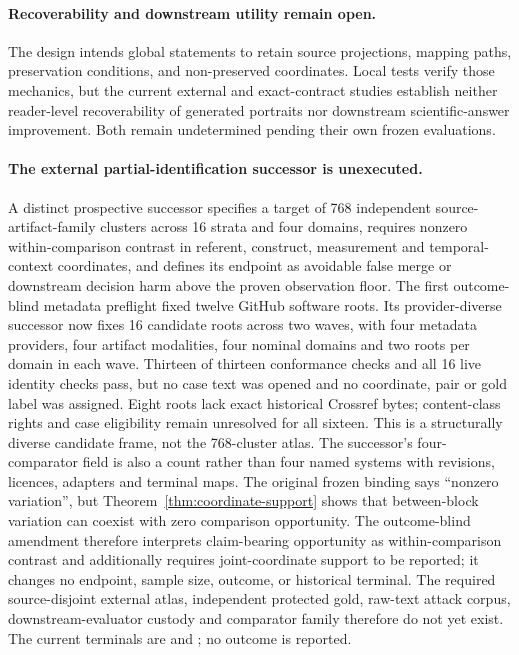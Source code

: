 \paragraph{Recoverability and downstream utility remain open.}
The design intends global statements to retain source projections, mapping
paths, preservation conditions, and non-preserved coordinates. Local tests
verify those mechanics, but the current external and exact-contract studies
establish neither reader-level recoverability of generated portraits nor
downstream scientific-answer improvement. Both remain undetermined pending
their own frozen evaluations.

\paragraph{The external partial-identification successor is unexecuted.}
A distinct prospective successor specifies a target of 768 independent
source-artifact-family clusters across 16 strata and four domains, requires
nonzero within-comparison contrast in referent, construct, measurement and temporal-context
coordinates, and defines its endpoint as avoidable false merge or downstream
decision harm above the proven observation floor. The first outcome-blind
metadata preflight fixed twelve GitHub software roots. Its provider-diverse
successor now fixes 16 candidate roots across two waves, with four metadata
providers, four artifact modalities, four nominal domains and two roots per
domain in each wave. Thirteen of thirteen conformance checks and all 16 live
identity checks pass, but no case text was opened and no coordinate, pair or
gold label was assigned. Eight roots lack exact historical Crossref bytes;
content-class rights and case eligibility remain unresolved for all sixteen.
This is a structurally diverse candidate frame, not the 768-cluster atlas.
The successor's four-comparator field is also a count rather than four named systems with
revisions, licences, adapters and terminal maps. The original frozen binding
says ``nonzero variation'', but Theorem~\ref{thm:coordinate-support} shows
that between-block variation can coexist with zero comparison opportunity.
The outcome-blind amendment therefore interprets claim-bearing opportunity as
within-comparison contrast and additionally requires joint-coordinate support
to be reported; it changes no endpoint, sample size, outcome, or historical
terminal. The required source-disjoint
external atlas, independent protected gold, raw-text attack corpus,
downstream-evaluator custody and comparator family therefore do not yet exist.
The current terminals are
and ; no outcome is reported.

